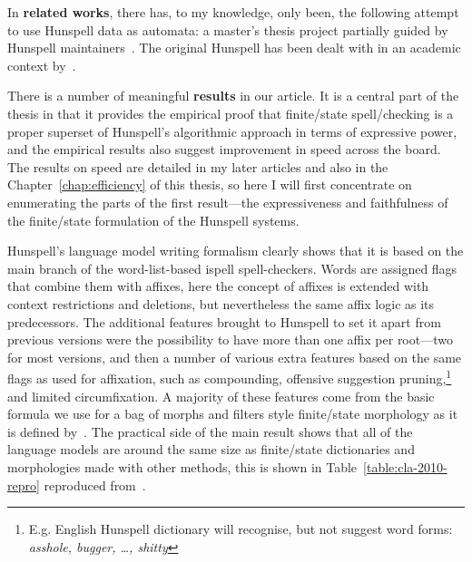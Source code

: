 \documentclass[officiallayout]{unihelcompling}
\begin{document}
In \textbf{related works}, there has, to my knowledge, only been, the following
attempt to use Hunspell data as automata: a master's thesis project partially
guided by Hunspell maintainers~\citep{greenfield2010open}.
The
original Hunspell has been dealt with in an academic context 
by~\citet{tron2005hunmorph}.

There is a number of meaningful \textbf{results} in our article. It
is a central part of the thesis in that it provides the empirical proof that
finite\-/state spell\-/checking is a proper superset of Hunspell's algorithmic 
approach in terms of expressive power, and the empirical results also suggest
improvement in speed across the board. The results on speed are detailed in my
later articles and also in the Chapter~\ref{chap:efficiency} of this thesis,
so here I will first concentrate on enumerating the parts of the first
result---the expressiveness and faithfulness of the finite\-/state formulation of
the Hunspell systems.

Hunspell's language model writing formalism clearly shows that it is based on
the main branch of the word-list-based ispell spell-checkers. Words are
assigned flags that combine them with affixes, here the concept of affixes is
extended with context restrictions and deletions, but nevertheless the same
affix logic as its predecessors. The additional features brought to Hunspell to
set it apart from previous versions were the possibility to have more than one
affix per root---two for most versions, and then a number of various extra
features based on the same flags as used for affixation, such as compounding,
offensive suggestion pruning,\footnote{E.g. English Hunspell dictionary will
    recognise, but not suggest word forms: \emph{asshole, bugger, \ldots,
shitty}} and limited circumfixation.  A majority of these features come from
the basic formula we use for a bag of morphs and filters style finite\-/state
morphology as it is defined by~\citet{linden2009hfst}. The practical side of
the main result shows that all of the language models are around the same size
as finite\-/state dictionaries and morphologies made with other methods, this
is shown in Table~\ref{table:cla-2010-repro} reproduced
from~.
\end{document}
